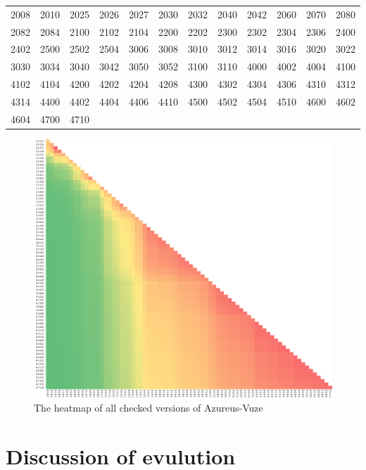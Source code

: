 \documentclass[a4paper,twoside,11pt]{article}
\newcommand{\av}{{\sc Azureus-Vuze}~}
\begin{document}
\begin{tabular}{cccccccccccc}
2008 & 2010 & 2025 & 2026 & 2027 & 2030 & 2032 & 2040 & 2042 & 2060 & 2070 & 2080 \\
2082 & 2084 & 2100 & 2102 & 2104 & 2200 & 2202 & 2300 & 2302 & 2304 & 2306 & 2400 \\
2402 & 2500 & 2502 & 2504 & 3006 & 3008 & 3010 & 3012 & 3014 & 3016 & 3020 & 3022 \\
3030 & 3034 & 3040 & 3042 & 3050 & 3052 & 3100 & 3110 & 4000 & 4002 & 4004 & 4100 \\
4102 & 4104 & 4200 & 4202 & 4204 & 4208 & 4300 & 4302 & 4304 & 4306 & 4310 & 4312 \\
4314 & 4400 & 4402 & 4404 & 4406 & 4410 & 4500 & 4502 & 4504 & 4510 & 4600 & 4602 \\
4604 & 4700 & 4710 &      &      &      &      &      &      &      &      &      \\
\end{tabular}



\begin{figure}[!h]
\includegraphics[scale=0.8]{../results/heatMap.pdf}
\caption{The heatmap of all checked versions of \av}
\label{fig:heatmap}
\end{figure}

\section{Discussion of evulution}
\label{sec:discussion}
\end{document}
